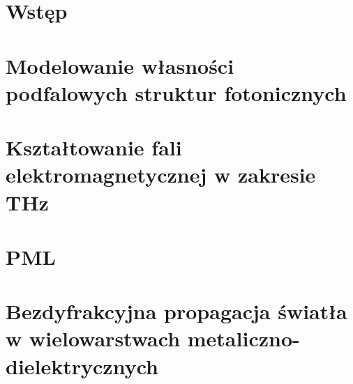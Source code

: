 \documentclass[pdflatex,11pt]{aghdpl}
\author{Marcin Stolarek}
\date{2014}
\begin{document}
\titlepages

\tableofcontents
\clearpage

\chapter{Wstęp}



\chapter{Modelowanie własności podfalowych struktur fotonicznych}


\chapter{Kształtowanie fali elektromagnetycznej w zakresie THz }



\chapter{PML}
\label{roz:pml}


\chapter{Bezdyfrakcyjna propagacja światła w wielowarstwach metaliczno-dielektrycznych}




\printnomenclature




\end{document}
